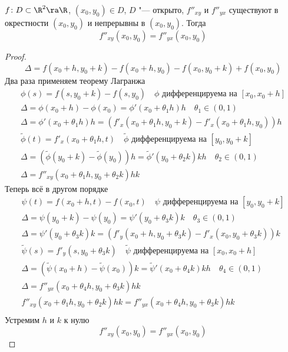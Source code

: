 \begin{theorem}
	$f\colon D \subset \R^2 \ra \R$, $(x_0, y_0) \in D$, $D$ "--- открыто, $f''_{xy}$ и $f''_{yx}$ существуют в окрестности $(x_0, y_0)$ и непрерывны в $(x_0, y_0)$.
	Тогда
	\[ f''_{xy} (x_0, y_0) = f''_{yx} (x_0, y_0) \]
\end{theorem}
\begin{proof}
	\[ \Delta = f(x_0 + h, y_0 + k) - f(x_0 + h, y_0) - f(x_0, y_0 + k) + f(x_0, y_0) \]
	Два раза применяем теорему Лагранжа
	\begin{gather*}
		\phi(s) = f(s, y_0 + k) - f(s, y_0) \quad \text{$\phi$ дифференцируема на $[x_0, x_0 + h]$} \\
		\Delta = \phi(x_0 + h) - \phi(x_0) = \phi'(x_0 + \theta_1 h) h \quad \theta_1 \in (0, 1) \\
		\Delta = \phi'(x_0 + \theta_1 h) h = (f'_x(x_0 + \theta_1 h, y_0 + k) - f'_x(x_0 + \theta_1 h, y_0)) h \\
		\tilde \phi(t) = f'_x(x_0 + \theta_1 h, t) \quad \text{$\tilde \phi$ дифференцируема на $[y_0, y_0 + k]$} \\
		\Delta = (\tilde \phi(y_0 + k) - \tilde \phi(y_0)) h = \tilde \phi' (y_0 + \theta_2 k) kh \quad \theta_2 \in (0, 1) \\
		\Delta = f''_{xy} (x_0 + \theta_1 h, y_0 + \theta_2 k) hk
	\end{gather*}
	Теперь всё в другом порядке
	\begin{gather*}
		\psi(t) = f(x_0 + h, t) - f(x_0, t) \quad \text{$\psi$ дифференцируема на $[y_0, y_0 + k]$} \\
		\Delta = \psi(y_0 + k) - \psi(y_0) = \psi'(y_0 + \theta_3 k) k \quad \theta_3 \in (0, 1) \\
		\Delta = \psi'(y_0 + \theta_3 k) k = (f'_y(x_0 + h, y_0 + \theta_3 k) - f'_x(x_0, y_0 + \theta_3 k)) k \\
		\tilde \psi(s) = f'_y(s, y_0 + \theta_3 k) \quad \text{$\tilde \psi$ дифференцируема на $[x_0, x_0 + h]$} \\
		\Delta = (\tilde \psi(x_0 + h) - \tilde \psi(x_0)) k = \tilde \psi' (x_0 + \theta_4 k) kh \quad \theta_4 \in (0, 1) \\
		\Delta = f''_{yx} (x_0 + \theta_4 h, y_0 + \theta_3 k) hk \\
		f''_{xy} (x_0 + \theta_1 h, y_0 + \theta_2 k) hk = f''_{yx} (x_0 + \theta_4 h, y_0 + \theta_3 k) hk \\
	\end{gather*}
	Устремим $h$ и $k$ к нулю
	\[ f''_{xy} (x_0, y_0) = f''_{yx} (x_0, y_0) \]
\end{proof}

